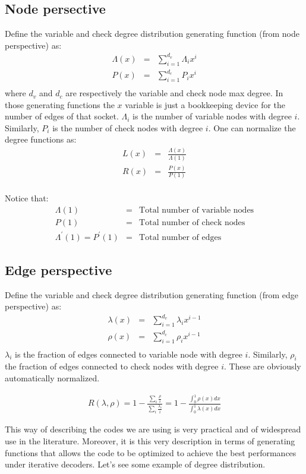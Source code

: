 \subsection{Node persective}
Define the variable and check degree distribution generating function (from node perspective) as:
\begin{eqnarray}
	\Lambda(x) &=& \sum_{i=1}^{d_v} \Lambda_i x^i \\
	P(x) &=& \sum_{i=1}^{d_c} P_i x^i \\
\end{eqnarray}
where $d_v$ and $d_c$ are respectively the variable and check node max degree. In those generating functions the $x$ variable is just a bookkeeping device for the number of edges of that socket.
$\Lambda_i$ is the number of variable nodes with degree $i$. Similarly, $P_i$ is the number of check nodes with degree $i$. One can normalize the degree functions as:
\begin{eqnarray}
L(x) &=& \frac{\Lambda(x)}{\Lambda(1)} \\
R(x) &=& \frac{P(x)}{P(1)} \\
\end{eqnarray}

Notice that:
\begin{eqnarray}
\Lambda(1) &=& \text{Total number of variable nodes} \\
P(1) &=& \text{Total number of check nodes} \\
\Lambda^\prime(1) = P^\prime(1) &=&  \text{Total number of edges}
\end{eqnarray}


\subsection{Edge perspective}
Define the variable and check degree distribution generating function (from edge perspective) as:
\begin{eqnarray}
\lambda(x) &=& \sum_{i=1}^{d_v} \lambda_i x^{i-1} \\
\rho(x) &=& \sum_{i=1}^{d_c} \rho_i x^{i-1} \\
\end{eqnarray}
$\lambda_i$ is the fraction of edges connected to variable node with degree $i$. Similarly, $\rho_i$ the fraction of edges connected to check nodes with degree $i$. These are obviously automatically normalized.
\begin{definition}
	\begin{eqnarray}
	R(\lambda, \rho) = 1 - \frac{\sum_i \frac{\rho}{i}}{\sum_i \frac{\lambda_i}{i}} = 1 - \frac{\int_0^1 \rho(x)dx}{\int_0^1 \lambda(x)dx}
	\end{eqnarray}
\end{definition}
This way of describing the codes we are using is very practical and of widespread use in the literature. Moreover, it is this very description in terms of generating functions that allows the code to be optimized to achieve the best performances under iterative decoders.
Let's see some example of degree distribution.
